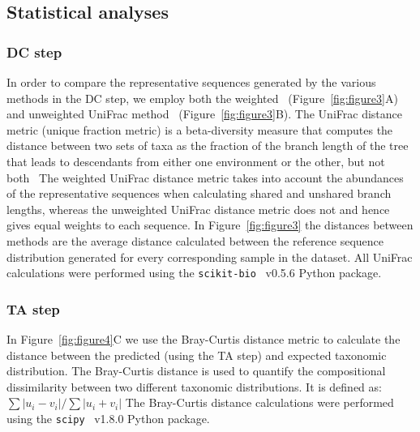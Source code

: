   \subsection*{Statistical analyses}
  \vspace{-5mm}

  \subsubsection*{DC step}
  In order to compare the representative sequences generated by the various methods in the DC step, we employ both the weighted~\cite{Lozupone2007} (Figure~\ref{fig:figure3}A) and unweighted UniFrac method~\cite{Lozupone2005} (Figure~\ref{fig:figure3}B).
  The UniFrac distance metric (unique fraction metric) is a beta-diversity measure that computes the distance between two sets of taxa as the fraction of the branch length of the tree that leads to descendants from either one environment or the other, but not both~\cite{Lozupone2005}
  The weighted UniFrac distance metric takes into account the abundances of the representative sequences when calculating shared and unshared branch lengths, whereas the unweighted UniFrac distance metric does not and hence gives equal weights to each sequence.
  In Figure~\ref{fig:figure3} the distances between methods are the average distance calculated between the reference sequence distribution generated for every corresponding sample in the dataset.
  All UniFrac calculations were performed using the \texttt{scikit-bio}~\cite{thescikit-biodevelopmentteamScikitbioBioinformaticsLibrary2022} v0.5.6 Python package.

  \subsubsection*{TA step}
  In Figure~\ref{fig:figure4}C we use the Bray-Curtis distance metric to calculate the distance between the predicted (using the TA step) and expected taxonomic distribution.
  The Bray-Curtis distance is used to quantify the compositional dissimilarity between two different taxonomic distributions.
  It is defined as: $\sum{|u_i-v_i|} / \sum{|u_i+v_i|}$
  The Bray-Curtis distance calculations were performed using the \texttt{scipy}~\cite{virtanenSciPyFundamentalAlgorithms2020} v1.8.0 Python package.

